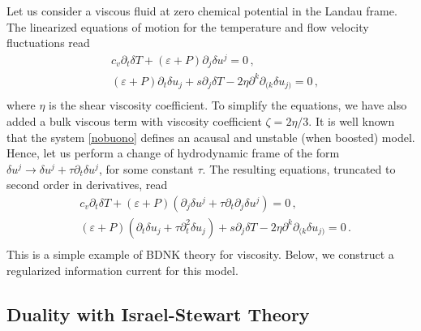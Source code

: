 \documentclass[a4paper, amsfonts, amssymb, amsmath, reprint, showkeys, nofootinbib, twoside,notitlepage,onecolumn,preprintnumbers]{revtex4-2}
\theoremstyle{definition}
\theoremstyle{theorem}
\theoremstyle{corollary}
\begin{document}
Let us consider a viscous fluid at zero chemical potential in the Landau frame. The linearized equations of motion for the temperature and flow velocity fluctuations read
\begin{equation}\label{nobuono}
\begin{split}
& c_v \partial_t \delta T +(\varepsilon{+}P)\partial_j \delta u^j =0 \, ,\\
& (\varepsilon{+}P)\partial_t \delta u_j+s\partial_j \delta T -2 \eta \partial^k \partial_{(k}\delta u_{j)} =0\, , \\
\end{split}
\end{equation}
where $\eta$ is the shear viscosity coefficient. To simplify the equations, we have also added a bulk viscous term with viscosity coefficient $\zeta=2\eta/3$. It is well known that the system \eqref{nobuono} defines an acausal and unstable (when boosted) model. Hence, let us perform a change of hydrodynamic frame of the form $\delta u^j \rightarrow \delta u^j +\tau \partial_t \delta u^j$, for some constant $\tau$. The resulting equations, truncated to second order in derivatives, read
\begin{equation}\label{sistemone}
\begin{split}
& c_v \partial_t \delta T +(\varepsilon{+}P)(\partial_j \delta u^j {+}\tau \partial_t \partial_j \delta u^j )=0 \, ,\\
& (\varepsilon{+}P)(\partial_t \delta u_j{+}\tau \partial_t^2 \delta u_j)+s\partial_j \delta T -2 \eta \partial^k \partial_{(k}\delta u_{j)} =0\, . \\
\end{split}
\end{equation}
This is a simple example of BDNK theory for viscosity. Below, we construct a regularized information current for this model.

\subsection{Duality with Israel-Stewart 
 Theory}
\end{document}
